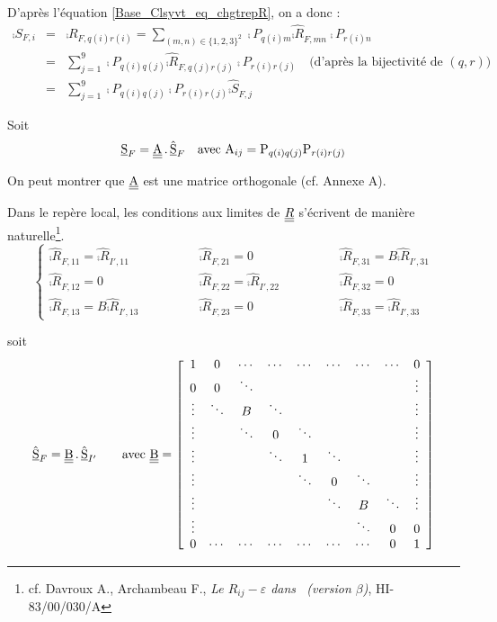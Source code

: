 D'apr\`es l'\'equation \ref{Base_Clsyvt_eq_chgtrepR}, on a donc :
\begin{eqnarray}
\comp{S}_{F,i} & = & \comp{R}_{F,q(i)r(i)} =
\sum_{(m,n)\in\{1,2,3\}^2}\comp{P}_{q(i)m}\hat{\comp{R}}_{F,mn}\comp{P}_{r(i)n}\nonumber\\
&=&\sum_{j=1}^9\comp{P}_{q(i)q(j)}\hat{\comp{R}}_{F,q(j)r(j)}\comp{P}_{r(i)r(j)}
\quad\text{(d'apr\`es la bijectivit\'e de $(q,r)$)}\nonumber\\
&=&\sum_{j=1}^9\comp{P}_{q(i)q(j)}\comp{P}_{r(i)r(j)}\hat{\comp{S}}_{F,j}
\end{eqnarray}

Soit
\begin{equation}
\underline{\textrm{S}}_{F}=\underline{\underline{\textrm{A}}}\,.\,\hat{\underline{\textrm{S}}}_F\quad\text{avec }
\textrm{A}_{ij}=\textrm{P}_{q(i)q(j)}\textrm{P}_{r(i)r(j)}
\end{equation}

On peut montrer que $\underline{\underline{\textrm{A}}}$ est une matrice orthogonale (cf. Annexe A).

Dans le rep\`ere local, les conditions aux limites de $\underline{\underline{R}}$ s'\'ecrivent de
mani\`ere naturelle\footnote{cf. Davroux A., Archambeau F., {\em Le
$R_{ij}-\varepsilon$ dans \CS\ (version $\beta$)}, HI-83/00/030/A}.
\begin{equation}
\label{Base_Clsyvt_eq_clRij}%
\left\{\begin{array}{lll}
\hat{\comp{R}}_{F,11}=\hat{\comp{R}}_{I',11} \qquad\qquad&
\hat{\comp{R}}_{F,21}=0 \qquad\qquad&
\hat{\comp{R}}_{F,31}=B\hat{\comp{R}}_{I',31} \\
\hat{\comp{R}}_{F,12}=0 \qquad\qquad&
\hat{\comp{R}}_{F,22}=\hat{\comp{R}}_{I',22} \qquad\qquad&
\hat{\comp{R}}_{F,32}=0 \\
\hat{\comp{R}}_{F,13}=B\hat{\comp{R}}_{I',13} \qquad\qquad&
\hat{\comp{R}}_{F,23}=0 \qquad\qquad&
\hat{\comp{R}}_{F,33}=\hat{\comp{R}}_{I',33}
\end{array}\right.
\end{equation}

soit
\renewcommand{\arraystretch}{0.5}
\begin{equation}
\hat{\underline{\textrm{S}}}_F=\underline{\underline{\textrm{B}}}\,.\,\hat{\underline{\textrm{S}}}_{I'}
\qquad\text{avec }\underline{\underline{\textrm{B}}}=
\left[\begin{array}{ccccccccc}
1&0&\cdots&\cdots&\cdots&\cdots&\cdots&\cdots&0\\
0&0&\ddots&&&&&&\vdots\\
\vdots&\ddots&B&\ddots&&&&&\vdots\\
\vdots&&\ddots&0&\ddots&&&&\vdots\\
\vdots&&&\ddots&1&\ddots&&&\vdots\\
\vdots&&&&\ddots&0&\ddots&&\vdots\\
\vdots&&&&&\ddots&B&\ddots&\vdots\\
\vdots&&&&&&\ddots&0&0\\
0&\cdots&\cdots&\cdots&\cdots&\cdots&\cdots&0&1
\end{array}\right]
\end{equation}
\renewcommand{\arraystretch}{1.}

